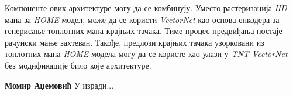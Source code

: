 \documentclass[11pt,oneside]{memoir}
\begin{document}
Компоненте ових архитектуре могу да се комбинују. Уместо растеризација \textit{HD} мапа за \textit{HOME} модел, може да се користи \textit{VectorNet}
као основа енкодера за генерисање топлотних мапа крајњих тачака. Тиме процес предвиђања постаје рачунски мање захтеван. Такође, предлози 
крајњих тачака узорковани из топлотних мапа \textit{HOME} модела могу да се користе као улази у \textit{TNT-VectorNet} без модификације
било које архитектуре.

\backmatter




\begin{biografija}
\textbf{Момир Аџемовић} 
У изради...
\end{biografija}
\end{document}
